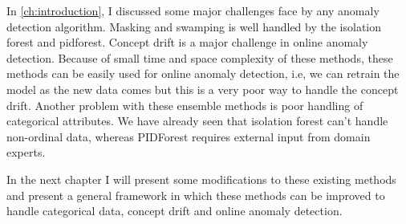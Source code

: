 In \cref{ch:introduction}, I discussed some major challenges face by any anomaly detection algorithm.
Masking and swamping is well handled by the isolation forest and pidforest. 
Concept drift is a major challenge in online anomaly detection. 
Because of small time and space complexity of these methods, these methods can be easily used for online anomaly detection, i.e, we can retrain the model as the new data comes but this is a very poor way to handle the concept drift.
Another problem with these ensemble methods is poor handling of categorical attributes.
We have already seen that isolation forest can't handle non-ordinal data, whereas PIDForest requires external input from domain experts.

In the next chapter I will present some modifications to these existing methods and present a general framework in which these methods can be improved to handle categorical data, concept drift and online anomaly detection.